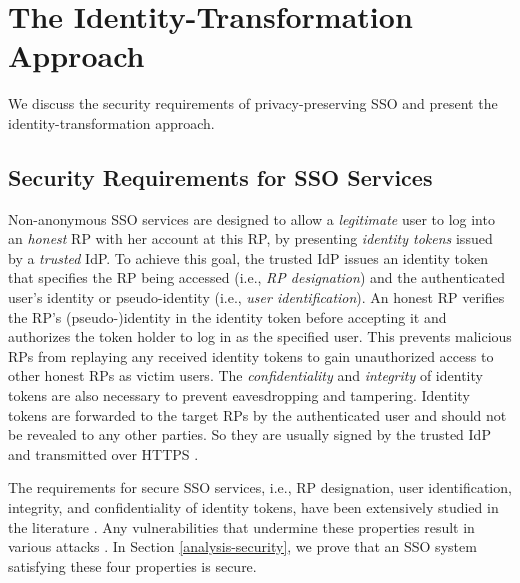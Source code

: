 \section{The Identity-Transformation Approach}
\label{sec:challenge}

We discuss the security requirements of privacy-preserving SSO and present the identity-transformation approach.


\subsection{Security Requirements for SSO Services}
\label{subsec:basicrequirements}

Non-anonymous SSO services \cite{OpenIDConnect,rfc6749,SAML,SAMLIdentifier,NIST2017draft} are designed to allow a \emph{legitimate} user to log into an \emph{honest} RP with her account at this RP, %
by presenting \emph{identity tokens} issued by a \emph{trusted} IdP.
To achieve this goal, the trusted IdP issues an identity token that specifies the RP being accessed (i.e., \emph{RP designation}) and the authenticated user's identity or pseudo-identity (i.e., \emph{user identification}).
An honest RP verifies the RP's (pseudo-)identity in the identity token before accepting it and authorizes the token holder to log in as the specified user. This prevents malicious RPs from replaying any received identity tokens to gain unauthorized access to other honest RPs as victim users.
The \emph{confidentiality} and \emph{integrity} of identity tokens are also necessary to prevent eavesdropping and tampering. Identity tokens are forwarded to the target RPs by the authenticated user and should not be revealed to any other parties. %
So they are usually signed by the trusted IdP and transmitted over HTTPS \cite{OpenIDConnect, rfc6749, SAML}.

The requirements for secure SSO services, i.e., RP designation, user identification, integrity, and confidentiality of identity tokens, have been extensively studied in the literature \cite{ArmandoCCCT08, SPRESSO, FettKS14, FettKS16, FettKS17}.
Any vulnerabilities that undermine these properties result in various attacks \cite{SomorovskyMSKJ12, WangCW12, ArmandoCCCPS13, ZhouE14, WangZLLYLG15, WangZLG16, YangLLZH16, MainkaMS16, MainkaMSW17, YangLCZ18, YangLS17, ShiWL19, ChenPCTKT14, ccsSunB12, DiscoveringJCS, dimvaLiM16, CaoSBKVC14, TowardsShehabM14}.
\newc
In Section \ref{analysis-security}, we prove that an SSO system satisfying these four properties is secure.
\oldc

